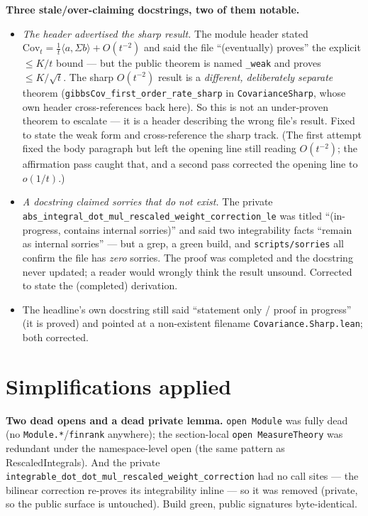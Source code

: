 \documentclass[11pt]{article}
\begin{document}
\textbf{Three stale/over-claiming docstrings, two of them notable.}
\begin{itemize}[noitemsep]
  \item \emph{The header advertised the sharp result.} The module header stated
    $\mathrm{Cov}_t=\tfrac1t\langle a,\Sigma b\rangle+O(t^{-2})$ and said the file ``(eventually)
    proves'' the explicit $\le K/t$ bound --- but the public theorem is named
    \texttt{\_weak} and proves $\le K/\sqrt t$. The sharp $O(t^{-2})$ result is a \emph{different,
    deliberately separate} theorem (\texttt{gibbsCov\_first\_order\_rate\_sharp} in
    \texttt{CovarianceSharp}, whose own header cross-references back here). So this is not an
    under-proven theorem to escalate --- it is a header describing the wrong file's result. Fixed to
    state the weak form and cross-reference the sharp track. (The first attempt fixed the body
    paragraph but left the opening line still reading $O(t^{-2})$; the affirmation pass caught that, and
    a second pass corrected the opening line to $o(1/t)$.)
  \item \emph{A docstring claimed sorries that do not exist.} The private
    \texttt{abs\_integral\_dot\_mul\_rescaled\_weight\_correction\_le} was titled ``(in-progress,
    contains internal sorries)'' and said two integrability facts ``remain as internal sorries'' --- but
    a grep, a green build, and \texttt{scripts/sorries} all confirm the file has \emph{zero} sorries.
    The proof was completed and the docstring never updated; a reader would wrongly think the result
    unsound. Corrected to state the (completed) derivation.
  \item The headline's own docstring still said ``statement only / proof in progress'' (it is proved)
    and pointed at a non-existent filename \texttt{Covariance.Sharp.lean}; both corrected.
\end{itemize}

\section{Simplifications applied}
\textbf{Two dead opens and a dead private lemma.} \texttt{open Module} was fully dead (no
\texttt{Module.*}/\texttt{finrank} anywhere); the section-local \texttt{open MeasureTheory} was
redundant under the namespace-level open (the same pattern as RescaledIntegrals). And the private
\texttt{integrable\_dot\_dot\_mul\_rescaled\_weight\_correction} had no call sites --- the bilinear
correction re-proves its integrability inline --- so it was removed (private, so the public surface is
untouched). Build green, public signatures byte-identical.
\end{document}
